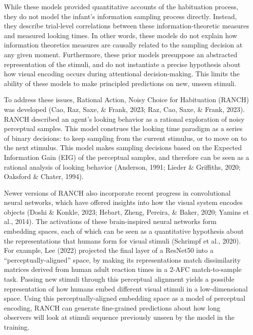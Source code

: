 \documentclass[10pt, letterpaper]{article}
\begin{document}
While these models provided quantitative accounts of the habituation
process, they do not model the infant's information sampling process
directly. Instead, they describe trial-level correlations between these
information-theoretic measures and measured looking times. In other
words, these models do not explain how information theoretics measures
are causally related to the sampling decision at any given moment.
Furthermore, these prior models presuppose an abstracted representation
of the stimuli, and do not instantiate a precise hypothesis about how
visual encoding occurs during attentional decision-making. This limits
the ability of these models to make principled predictions on new,
unseen stimuli.

To address these issues, Rational Action, Noisy Choice for Habituation
(RANCH) was developed (Cao, Raz, Saxe, \& Frank, 2023; Raz, Cao, Saxe,
\& Frank, 2023). RANCH described an agent's looking behavior as a
rational exploration of noisy perceptual samples. This model construes
the looking time paradigm as a series of binary decisions: to keep
sampling from the current stimulus, or to move on to the next stimulus.
This model makes sampling decisions based on the Expected Information
Gain (EIG) of the perceptual samples, and therefore can be seen as a
rational analysis of looking behavior (Anderson, 1991; Lieder \&
Griffiths, 2020; Oaksford \& Chater, 1994).

Newer versions of RANCH also incorporate recent progress in
convolutional neural networks, which have offered insights into how the
visual system encodes objects (Doshi \& Konkle, 2023; Hebart, Zheng,
Pereira, \& Baker, 2020; Yamins et al., 2014). The activations of these
brain-inspired neural networks form embedding spaces, each of which can
be seen as a quantitative hypothesis about the representations that
humans form for visual stimuli (Schrimpf et al., 2020). For example, Lee
(2022) projected the final layer of a ResNet50 into a
``perceptually-aligned'' space, by making its representations match
dissimilarity matrices derived from human adult reaction times in a
2-AFC match-to-sample task. Passing new stimuli through this perceptual
alignment yields a possible representation of how humans embed different
visual stimuli in a low-dimensional space. Using this
perceptually-aligned embedding space as a model of perceptual encoding,
RANCH can generate fine-grained predictions about how long observers
will look at stimuli sequence previously unseen by the model in the
training.
\end{document}
